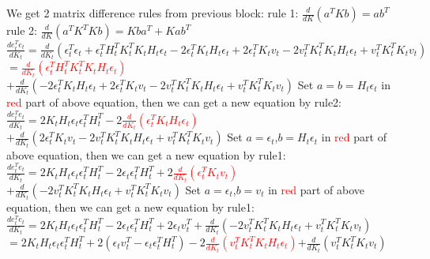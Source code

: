 \documentclass[a4 paper]{article}
\begin{document}
\begin{tcolorbox}[colback=YellowGreen!5!white,colframe=YellowGreen!75!black,title={Problem 2's answer}]
    We get 2 matrix difference rules from previous block:\newline
    \hspace*{0.5cm}rule 1: $\frac{d}{dK}(a^TKb)=ab^T$\newline
    \hspace*{0.5cm}rule 2: $\frac{d}{dK}(a^TK^TKb)=Kba^T+Kab^T$\newline
    \newline
    $\frac{de_t^Te_t}{dK_t}=\frac{d}{dK_t}(\epsilon_t^T\epsilon_t+\epsilon_t^TH_t^TK_t^TK_tH_t\epsilon_t-2\epsilon_t^TK_tH_t\epsilon_t+2\epsilon_t^TK_tv_t-2v_t^TK_t^TK_tH_t\epsilon_t+v_t^TK_t^TK_tv_t)$\newline
    \hspace*{0.5cm}$=$\textcolor{red}{$\frac{d}{dK_t}(\epsilon_t^TH_t^TK_t^TK_tH_t\epsilon_t)$}$+\frac{d}{dK_t}(-2\epsilon_t^TK_tH_t\epsilon_t+2\epsilon_t^TK_tv_t-2v_t^TK_t^TK_tH_t\epsilon_t+v_t^TK_t^TK_tv_t)$\newline
    Set $a=b=H_t\epsilon_t$ in \textcolor{red}{red} part of above equation, then we can get a new equation by rule2:\newline
    $\frac{de_t^Te_t}{dK_t}=2K_tH_t\epsilon_t\epsilon_t^TH_t^T-2$\textcolor{red}{$\frac{d}{dK_t}(\epsilon_t^TK_tH_t\epsilon_t)$}$+\frac{d}{dK_t}(2\epsilon_t^TK_tv_t-2v_t^TK_t^TK_tH_t\epsilon_t+v_t^TK_t^TK_tv_t)$\newline
    Set $a=\epsilon_t$,$b=H_t\epsilon_t$ in \textcolor{red}{red} part of above equation, then we can get a new equation by rule1:\newline
    $\frac{de_t^Te_t}{dK_t}=2K_tH_t\epsilon_t\epsilon_t^TH_t^T-2\epsilon_t\epsilon_t^TH_t^T+2$\textcolor{red}{$\frac{d}{dK_t}(\epsilon_t^TK_tv_t)$}$+\frac{d}{dK_t}(-2v_t^TK_t^TK_tH_t\epsilon_t+v_t^TK_t^TK_tv_t)$\newline
    Set $a=\epsilon_t$,$b=v_t$ in \textcolor{red}{red} part of above equation, then we can get a new equation by rule1:\newline
    $\frac{de_t^Te_t}{dK_t}=2K_tH_t\epsilon_t\epsilon_t^TH_t^T-2\epsilon_t\epsilon_t^TH_t^T+2\epsilon_tv_t^T+\frac{d}{dK_t}(-2v_t^TK_t^TK_tH_t\epsilon_t+v_t^TK_t^TK_tv_t)$\newline
    \hspace*{0.5cm}$=2K_tH_t\epsilon_t\epsilon_t^TH_t^T+2(\epsilon_tv_t^T-\epsilon_t\epsilon_t^TH_t^T)-2$\textcolor{red}{$\frac{d}{dK_t}(v_t^TK_t^TK_tH_t\epsilon_t)$}$+\frac{d}{dK_t}(v_t^TK_t^TK_tv_t)$\newline

\end{tcolorbox}
\end{document}
